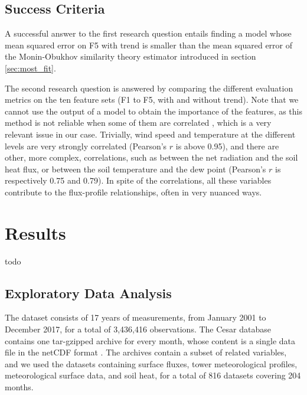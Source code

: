 \documentclass[12pt]{book}
\begin{document}
\section{Success Criteria}
\label{sec:success}
A successful answer to the first research question entails finding a model whose mean squared error on F5 with trend is smaller than the mean squared error of the Monin-Obukhov similarity theory estimator introduced in section \ref{sec:most_fit}.

The second research question is answered by comparing the different evaluation metrics on the ten feature sets (F1 to F5, with and without trend). Note that we cannot use the output of a model to obtain the importance of the features, as this method is not reliable when some of them are correlated \citep{rf_bias,rf_corr_imp}, which is a very relevant issue in our case. Trivially, wind speed and temperature at the different levels are very strongly correlated (Pearson's $r$ is above 0.95), and there are other, more complex, correlations, such as between the net radiation and the soil heat flux, or between the soil temperature and the dew point (Pearson's $r$ is respectively 0.75 and 0.79). In spite of the correlations, all these variables contribute to the flux-profile relationships, often in very nuanced ways.



\chapter{Results}
\label{ch:results}
todo

\section{Exploratory Data Analysis}
The dataset consists of 17 years of measurements, from January 2001 to December 2017, for a total of 3,436,416 observations. The Cesar database contains one tar-gzipped archive for every month, whose content is a single data file in the netCDF format \citep{netcdf}. The archives contain a subset of related variables, and we used the datasets containing surface fluxes, tower meteorological profiles, meteorological surface  data, and soil heat, for a total of 816 datasets covering 204 months.
\end{document}
